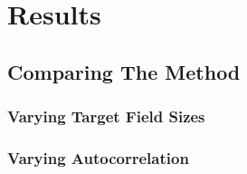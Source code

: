 \chapter{Results}

\section{Comparing The Method}

\subsection{Varying Target Field Sizes}




\subsection{Varying Autocorrelation}



